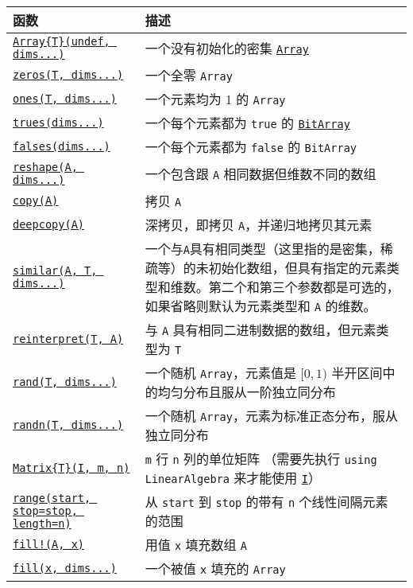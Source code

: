 \begin{table}[h]

\begin{tabulary}{\linewidth}{|L|L|}
\hline
函数 & 描述 \\
\hline
\hyperlink{15492651498431872487}{\texttt{Array\{T\}(undef, dims...)}} & 一个没有初始化的密集 \hyperlink{15492651498431872487}{\texttt{Array}} \\
\hline
\hyperlink{13837674686090348619}{\texttt{zeros(T, dims...)}} & 一个全零 \texttt{Array} \\
\hline
\hyperlink{5858390260510292771}{\texttt{ones(T, dims...)}} & 一个元素均为 1 的 \texttt{Array} \\
\hline
\hyperlink{12844393578243965152}{\texttt{trues(dims...)}} & 一个每个元素都为 \texttt{true} 的 \hyperlink{18015155802543401629}{\texttt{BitArray}} \\
\hline
\hyperlink{12518029339635756199}{\texttt{falses(dims...)}} & 一个每个元素都为 \texttt{false} 的 \texttt{BitArray} \\
\hline
\hyperlink{3388738163419525310}{\texttt{reshape(A, dims...)}} & 一个包含跟 \texttt{A} 相同数据但维数不同的数组 \\
\hline
\hyperlink{15665284441316555522}{\texttt{copy(A)}} & 拷贝 \texttt{A} \\
\hline
\hyperlink{3259459540194502889}{\texttt{deepcopy(A)}} & 深拷贝，即拷贝 \texttt{A}，并递归地拷贝其元素 \\
\hline
\hyperlink{15525808546723795098}{\texttt{similar(A, T, dims...)}} & 一个与\texttt{A}具有相同类型（这里指的是密集，稀疏等）的未初始化数组，但具有指定的元素类型和维数。第二个和第三个参数都是可选的，如果省略则默认为元素类型和 \texttt{A} 的维数。 \\
\hline
\hyperlink{293815781001952115}{\texttt{reinterpret(T, A)}} & 与 \texttt{A} 具有相同二进制数据的数组，但元素类型为 \texttt{T} \\
\hline
\hyperlink{7668863842145012694}{\texttt{rand(T, dims...)}} & 一个随机 \texttt{Array}，元素值是  \([0, 1)\)  半开区间中的均匀分布且服从一阶独立同分布 \footnotemark[1] \\
\hline
\hyperlink{7347069443766288058}{\texttt{randn(T, dims...)}} & 一个随机 \texttt{Array}，元素为标准正态分布，服从独立同分布 \\
\hline
\hyperlink{5448927444601277512}{\texttt{Matrix\{T\}(I, m, n)}} & \texttt{m} 行 \texttt{n} 列的单位矩阵 （需要先执行 \texttt{using LinearAlgebra} 来才能使用 \hyperlink{15346645596018210602}{\texttt{I}}） \\
\hline
\hyperlink{737600656772861535}{\texttt{range(start, stop=stop, length=n)}} & 从 \texttt{start} 到 \texttt{stop} 的带有 \texttt{n} 个线性间隔元素的范围 \\
\hline
\hyperlink{5162290739791026948}{\texttt{fill!(A, x)}} & 用值 \texttt{x} 填充数组 \texttt{A} \\
\hline
\hyperlink{2836152204730819918}{\texttt{fill(x, dims...)}} & 一个被值 \texttt{x} 填充的 \texttt{Array} \\
\hline
\end{tabulary}

\end{table}



